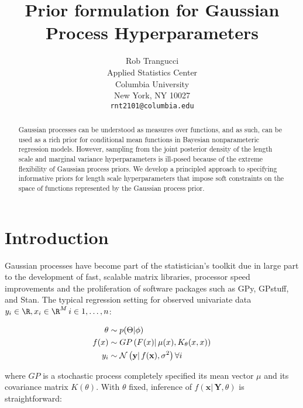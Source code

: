 \documentclass{article}
\title{Prior formulation for Gaussian Process Hyperparameters}
\author{
  Rob Trangucci \\
  Applied Statistics Center\\
  Columbia University\\
  New York, NY 10027 \\
  \texttt{rnt2101@columbia.edu} \\
}
\newcommand{\lp}{\ensuremath{\left(}}
\newcommand{\rp}{\ensuremath{\right)}}
\begin{document}

\maketitle

\begin{abstract}
  Gaussian processes can be understood as measures over functions, and as such,
  can be used as a rich prior for conditional mean functions in Bayesian
  nonparameteric regression models. However, sampling from the joint posterior
  density of the length scale and marginal variance hyperparameters is
  ill-posed because of the extreme flexibility of Gaussian process priors. We
  develop a principled approach to specifying informative priors for length
  scale hyperparameters that impose soft constraints on the space of functions
  represented by the Gaussian process prior. 
 \end{abstract}

\section{Introduction}

Gaussian processes have become part of the statistician's toolkit due in large
part to the development of fast, scalable matrix libraries, processor speed
improvements and the proliferation of software packages such as GPy, GPstuff,
and Stan. The typical regression setting for observed univariate data
$y_i \in \R, x_i \in \R^M\, i \in {1,\dots,n}$:

\begin{align*}
  \theta & \sim p(\Theta | \phi) \\
  f(x) & \sim GP\lp F(x) |\, \mu(x),
  K_\theta(x, x) \rp \\
  y_i & \sim \mathcal{N}\lp \mathbf{y} | \, f(\mathbf{x}), \sigma^2 \rp \forall i \\
\end{align*}

where $GP$ is a stochastic process completely specified its mean vector $\mu$
and its covariance matrix $K(\theta)$. With $\theta$ fixed,
inference of $f(\mathbf{x} | \, \mathbf{Y}, \theta)$ is straightforward:
\end{document}
